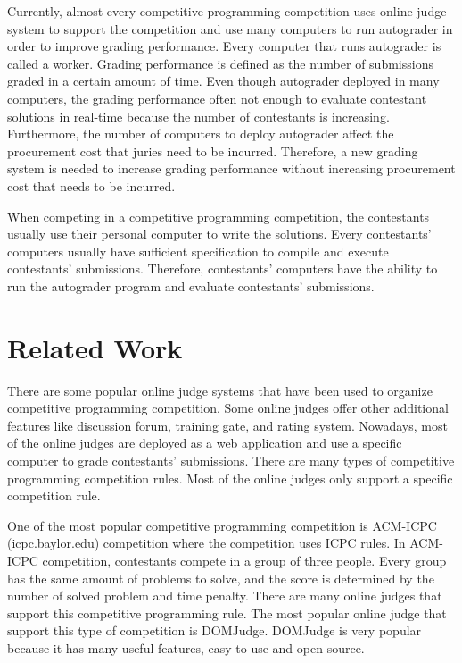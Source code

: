 \documentclass[conference,a4paper]{IEEEtran}
\begin{document}
Currently, almost every competitive programming competition uses online judge system to support the competition and use many computers to run autograder in order to improve grading performance. Every computer that runs autograder is called a worker. Grading performance is defined as the number of submissions graded in a certain amount of time. Even though autograder deployed in many computers, the grading performance often not enough to evaluate contestant solutions in real-time because the number of contestants is increasing. Furthermore, the number of computers to deploy autograder affect the procurement cost that juries need to be incurred. Therefore, a new grading system is needed to increase grading performance without increasing procurement cost that needs to be incurred.

When competing in a competitive programming competition, the contestants usually use their personal computer to write the solutions. Every contestants' computers usually have sufficient specification to compile and execute contestants' submissions. Therefore, contestants' computers have the ability to run the autograder program and evaluate contestants' submissions.

\section{Related Work}

There are some popular online judge systems that have been used to organize competitive programming competition. Some online judges offer other additional features like discussion forum, training gate, and rating system. Nowadays, most of the online judges are deployed as a web application and use a specific computer to grade contestants' submissions. There are many types of competitive programming competition rules. Most of the online judges only support a specific competition rule.

One of the most popular competitive programming competition is ACM-ICPC (icpc.baylor.edu) competition where the competition uses ICPC rules. In ACM-ICPC competition, contestants compete in a group of three people. Every group has the same amount of problems to solve, and the score is determined by the number of solved problem and time penalty. There are many online judges that support this competitive programming rule. The most popular online judge that support this type of competition is DOMJudge. DOMJudge is very popular because it has many useful features, easy to use and open source.
\end{document}

